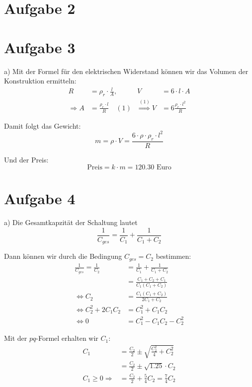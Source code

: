 \documentclass[11pt a4paper]{article}
\begin{document}
\section*{Aufgabe 2}
\section*{Aufgabe 3}

a)
Mit der Formel für den elektrischen Widerstand können wir das Volumen der 
Konstruktion ermitteln:
\begin{align*}
	R &= \rho_r \cdot \frac{l}{A}, & V &= 6 \cdot l \cdot A \\
	\Rightarrow A &= \frac{\rho_r \cdot l}{R} \quad (1)
	& \overset{(1)}{\Rightarrow} V &= 6 \frac{\rho_r \cdot l^2}{R}
\end{align*}

Damit folgt das Gewicht:
\[
	m = \rho \cdot V = \frac{6 \cdot \rho \cdot \rho_r \cdot l^2}{R}
\]

Und der Preis:
\[
	\text{Preis} = k \cdot m = 120.30 \text{ Euro}
\]

\section*{Aufgabe 4}
a)
Die Gesamtkapzität der Schaltung lautet
\[
	\frac{1}{C_{ges}} = \frac{1}{C_1} + \frac{1}{C_1 + C_2}
\]

Dann können wir durch die Bedingung $C_{ges} = C_2$ bestimmen:
\begin{align*}
	\frac{1}{C_{ges}} = \frac{1}{C_2}
	&= \frac{1}{C_1} + \frac{1}{C_1 + C_2} \\
	&= \frac{C_1 + C_2 + C_1}{C_1 (C_1 + C_2)} \\
	\Leftrightarrow
	C_2 &= \frac{C_1 (C_1 + C_2)}{2C_1 + C_2} \\
	\Leftrightarrow
	C_2^2 + 2C_1C_2 &= C_1^2 + C_1C_2 \\
	\Leftrightarrow
	0 &= C_1^2 - C_1C_2 - C_2^2
\end{align*}

Mit der $pq$-Formel erhalten wir $C_1$:
\begin{align*}
	C_1 &= \frac{C_2}{2} \pm \sqrt{\frac{C_2^2}{4} + C_2^2} \\
	&= \frac{C_2}{2} \pm \sqrt{1.25} \cdot C_2 \\
	C_1 \geq 0 \Rightarrow
	&= \frac{C_2}{2} + \frac{5}{4} C_2 = \frac{7}{4} C_2
\end{align*}
\end{document}

